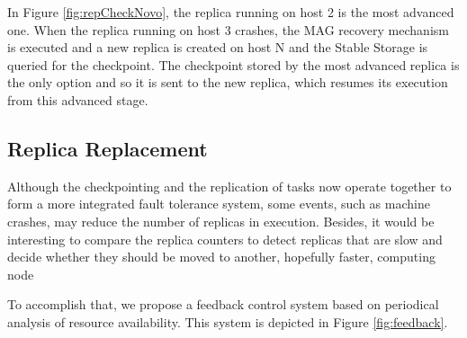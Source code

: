 \documentclass[times, 09pt, twocolumn]{article}
\begin{document}
In Figure \ref{fig:repCheckNovo}, the replica running on host 2 is the most advanced one. When
the replica running on host 3 crashes, the MAG recovery mechanism is executed
and a new replica is created on host N and the Stable Storage is queried for the
checkpoint. The checkpoint stored by the most advanced replica is the only
option and so it is sent to the new replica, which resumes its execution
from this advanced stage. 

\subsection{Replica Replacement}

Although the checkpointing and the replication of tasks now operate together to
form a more integrated fault tolerance system, some events, such as machine crashes,
may reduce the number of replicas in execution. Besides,
it would be interesting to compare the replica counters to
detect replicas that are slow and decide whether they should be moved 
to another, hopefully faster, computing node

To accomplish that, we propose a feedback control system based on periodical
analysis of resource availability. This system is depicted in Figure
\ref{fig:feedback}.
\end{document}
